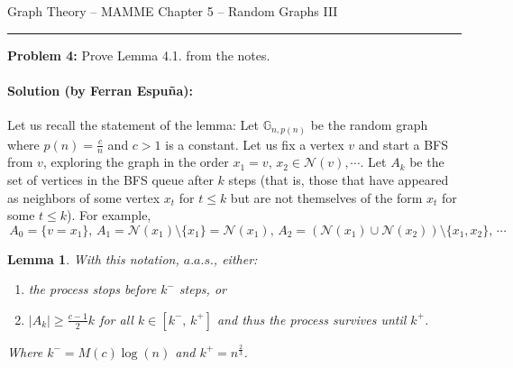 \documentclass{amsart}
\theoremstyle{plain}
\newtheorem*{lemma}{\textbf{Lemma}}
\theoremstyle{definition}
\begin{document}
    {\Large Graph Theory -- MAMME}
    {\Large Chapter 5 -- Random Graphs III}

    \vspace{0.5cm}

    \hrule

    \vspace{0.5cm}

    \noindent \textbf{Problem 4:}
    Prove Lemma 4.1. from the notes.


    \paragraph{\textbf{Solution (by Ferran Espuña):}}
    Let us recall the statement of the lemma:
    Let $\mathbb{G}_{n,p(n)}$ be the random graph where $p(n) = \frac{c}{n}$ and $c > 1$ is a constant.
    Let us fix a vertex $v$ and start a BFS from $v$, exploring the graph in the order
    $x_1 = v,\, x_2 \in \mathcal{N}(v), \cdots$.
    Let $A_k$ be the set of vertices in the BFS queue after $k$ steps (that is, those that have appeared
    as neighbors of some vertex $x_t$ for $t \leq k$ but are not themselves of the form $x_t$ for some $t \leq k$).
    For example,$
    \, A_0 = \{ v = x_1 \}, \,
    A_1 = \mathcal{N}(x_1) \setminus \{x_1\} = \mathcal{N}(x_1), \,
    A_2 = (\mathcal{N}(x_1) \cup \mathcal{N}(x_2)) \setminus \{x_1, x_2\}, \, \cdots$

    \begin{lemma}
        With this notation, $a.a.s.$, either:
        \begin{enumerate}
            \item the process stops before $k^-$ steps, or \label{itm:1}
            \item $|A_k| \geq \frac{c - 1}{2}k$ for all $k \in [k^{-}, \, k^{+}]$
            and thus the process survives until $k^{+}$. \label{itm:2}
        \end{enumerate}
        Where $k^{-} = M(c)\log(n)$ and $k^{+} = n^{\frac{2}{3}}$.
    \end{lemma}
\end{document}
